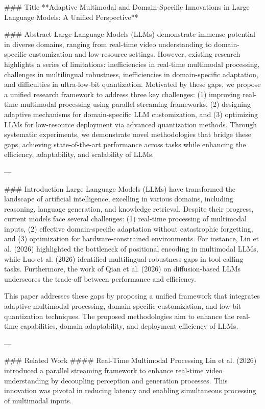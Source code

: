 ### Title  
**Adaptive Multimodal and Domain-Specific Innovations in Large Language Models: A Unified Perspective**

### Abstract  
Large Language Models (LLMs) demonstrate immense potential in diverse domains, ranging from real-time video understanding to domain-specific customization and low-resource settings. However, existing research highlights a series of limitations: inefficiencies in real-time multimodal processing, challenges in multilingual robustness, inefficiencies in domain-specific adaptation, and difficulties in ultra-low-bit quantization. Motivated by these gaps, we propose a unified research framework to address three key challenges: (1) improving real-time multimodal processing using parallel streaming frameworks, (2) designing adaptive mechanisms for domain-specific LLM customization, and (3) optimizing LLMs for low-resource deployment via advanced quantization methods. Through systematic experiments, we demonstrate novel methodologies that bridge these gaps, achieving state-of-the-art performance across tasks while enhancing the efficiency, adaptability, and scalability of LLMs.  

---

### Introduction  
Large Language Models (LLMs) have transformed the landscape of artificial intelligence, excelling in various domains, including reasoning, language generation, and knowledge retrieval. Despite their progress, current models face several challenges: (1) real-time processing of multimodal inputs, (2) effective domain-specific adaptation without catastrophic forgetting, and (3) optimization for hardware-constrained environments. For instance, Lin et al. (2026) highlighted the bottleneck of positional encoding in multimodal LLMs, while Luo et al. (2026) identified multilingual robustness gaps in tool-calling tasks. Furthermore, the work of Qian et al. (2026) on diffusion-based LLMs underscores the trade-off between performance and efficiency.  

This paper addresses these gaps by proposing a unified framework that integrates adaptive multimodal processing, domain-specific customization, and low-bit quantization techniques. The proposed methodologies aim to enhance the real-time capabilities, domain adaptability, and deployment efficiency of LLMs.  

---

### Related Work  
#### Real-Time Multimodal Processing  
Lin et al. (2026) introduced a parallel streaming framework to enhance real-time video understanding by decoupling perception and generation processes. This innovation was pivotal in reducing latency and enabling simultaneous processing of multimodal inputs.  

